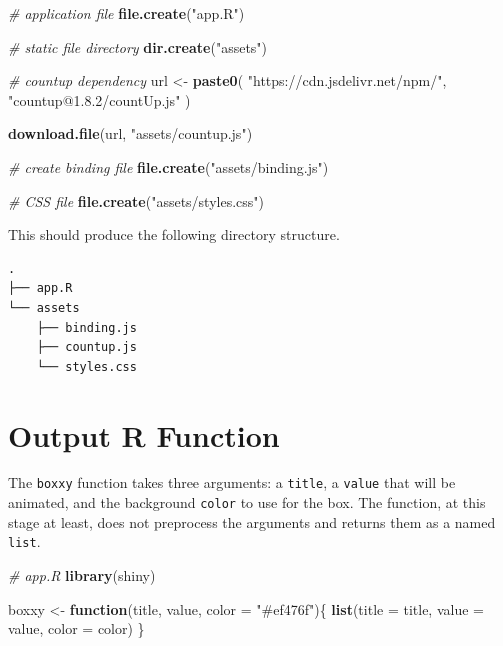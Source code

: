 \documentclass[10pt,]{krantz}
\makeatletter
\newenvironment{Shaded}{\begin{snugshade}}{\end{snugshade}}
\newcommand{\CommentTok}[1]{\textcolor[rgb]{0.37,0.37,0.37}{\textit{#1}}}
\newcommand{\ControlFlowTok}[1]{\textcolor[rgb]{0.27,0.27,0.27}{\textbf{#1}}}
\newcommand{\DataTypeTok}[1]{\textcolor[rgb]{0.27,0.27,0.27}{#1}}
\newcommand{\KeywordTok}[1]{\textcolor[rgb]{0.27,0.27,0.27}{\textbf{#1}}}
\newcommand{\NormalTok}[1]{#1}
\newcommand{\StringTok}[1]{\textcolor[rgb]{0.5,0.5,0.5}{#1}}
\newenvironment{kframe}{%
\medskip{}
\setlength{\fboxsep}{.8em}
 \def\at@end@of@kframe{}%
 \ifinner\ifhmode%
  \def\at@end@of@kframe{\end{minipage}}%
  \begin{minipage}{\columnwidth}%
 \fi\fi%
 \def\FrameCommand##1{\hskip\@totalleftmargin \hskip-\fboxsep
 \colorbox{shadecolor}{##1}\hskip-\fboxsep
     \hskip-\linewidth \hskip-\@totalleftmargin \hskip\columnwidth}%
 \MakeFramed {\advance\hsize-\width
   \@totalleftmargin\z@ \linewidth\hsize
   \@setminipage}}%
 {\par\unskip\endMakeFramed%
 \at@end@of@kframe}
\renewenvironment{Shaded}{\begin{kframe}}{\end{kframe}}
\makeatother
\begin{document}
\begin{Shaded}
\begin{Highlighting}[]
\CommentTok{# application file}
\KeywordTok{file.create}\NormalTok{(}\StringTok{"app.R"}\NormalTok{)}

\CommentTok{# static file directory}
\KeywordTok{dir.create}\NormalTok{(}\StringTok{"assets"}\NormalTok{)}

\CommentTok{# countup dependency}
\NormalTok{url <-}\StringTok{ }\KeywordTok{paste0}\NormalTok{(}
  \StringTok{"https://cdn.jsdelivr.net/npm/"}\NormalTok{,}
  \StringTok{"countup@1.8.2/countUp.js"}
\NormalTok{)}

\KeywordTok{download.file}\NormalTok{(url, }\StringTok{"assets/countup.js"}\NormalTok{)}

\CommentTok{# create binding file}
\KeywordTok{file.create}\NormalTok{(}\StringTok{"assets/binding.js"}\NormalTok{)}

\CommentTok{# CSS file}
\KeywordTok{file.create}\NormalTok{(}\StringTok{"assets/styles.css"}\NormalTok{)}
\end{Highlighting}
\end{Shaded}

This should produce the following directory structure.

\begin{verbatim}
.
├── app.R
└── assets
    ├── binding.js
    ├── countup.js
    └── styles.css
\end{verbatim}

\hypertarget{shiny-output-r-fun}{%
\section{Output R Function}\label{shiny-output-r-fun}}

The \texttt{boxxy} function takes three arguments: a \texttt{title}, a \texttt{value} that will be animated, and the background \texttt{color} to use for the box. The function, at this stage at least, does not preprocess the arguments and returns them as a named \texttt{list}.

\begin{Shaded}
\begin{Highlighting}[]
\CommentTok{# app.R}
\KeywordTok{library}\NormalTok{(shiny)}

\NormalTok{boxxy <-}\StringTok{ }\ControlFlowTok{function}\NormalTok{(title, value, }\DataTypeTok{color =} \StringTok{"#ef476f"}\NormalTok{)\{}
  \KeywordTok{list}\NormalTok{(}\DataTypeTok{title =}\NormalTok{ title, }\DataTypeTok{value =}\NormalTok{ value, }\DataTypeTok{color =}\NormalTok{ color)}
\NormalTok{\}}
\end{Highlighting}
\end{Shaded}
\end{document}
